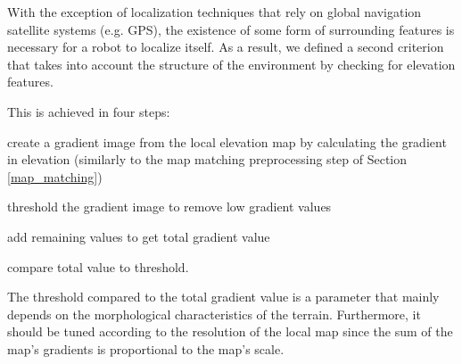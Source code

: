 With the exception of localization techniques that rely on global navigation
satellite systems (e.g. GPS), the existence of some form of surrounding
features is necessary for a robot to localize itself.
As a result, we defined a second criterion that takes into account
the structure of the environment by checking for elevation features.

This is achieved in four steps:
\begin{enumerate*}[label=(\roman*)]
    \item create a gradient image from the local elevation map by calculating
        the gradient in elevation (similarly to the map matching preprocessing
        step of Section \ref{map_matching})
    \item threshold the gradient image to remove low gradient values
    \item add remaining values to get total gradient value
    \item compare total value to threshold.
\end{enumerate*}

The threshold compared to the total gradient value is a parameter that mainly
depends on the morphological characteristics of the terrain.
Furthermore, it should be tuned according to the resolution of the local
map since the sum of the map's gradients is proportional to the map's scale.


